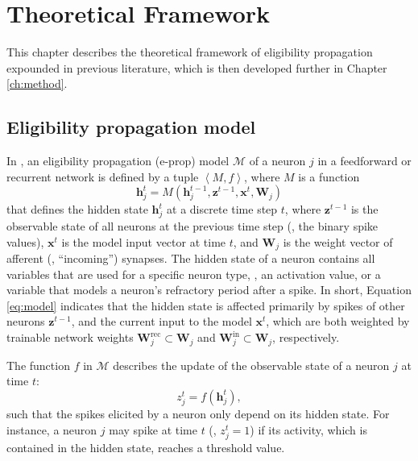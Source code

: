 \chapter{Theoretical Framework}\label{ch:relatedwork}

    This chapter describes the theoretical framework of eligibility propagation expounded in previous literature, which is then developed further in Chapter \ref{ch:method}.

    \section{Eligibility propagation model}
        In \citet{bellec2020solution}, an eligibility propagation (e-prop) model $\mathcal{M}$ of a neuron $j$ in a feedforward or recurrent network is defined by a tuple $\left<M, f\right>$,
        where $M$ is a function
        \begin{equation}\label{eq:model}
        \mathbf{h}^t_j = M\left(\mathbf{h}_j^{t-1}, \mathbf{z}^{t-1}, \mathbf{x}^t, \mathbf{W}_j\right)
        \end{equation}
        that defines the hidden state $\mathbf{h}_j^t$ at a discrete time step $t$, where $\mathbf{z}^{t-1}$ is the observable state of all neurons at the previous time step (\ie, the binary spike values), $\mathbf{x}^t$ is the model input vector at time $t$, and $\mathbf{W}_j$ is the weight vector of afferent (\ie, ``incoming'') synapses.
        The hidden state of a neuron contains all variables that are used for a specific neuron type, \eg, an activation value, or a variable that models a neuron's refractory period after a spike.
        In short, Equation \ref{eq:model} indicates that the hidden state is affected primarily by spikes of other neurons $\mathbf{z}^{t-1}$, and the current input to the model $\mathbf{x}^t$, which are both weighted by trainable network weights $\mathbf{W}^\text{rec}_j \subset \mathbf{W}_j$ and $\mathbf{W}^\text{in}_j \subset \mathbf{W}_j$, respectively.

        The function $f$ in $\mathcal{M}$ describes the update of the observable state of a neuron $j$ at time $t$:
        \begin{equation}\label{eq:observable}
        z^t_j = f\left(\mathbf{h}_j^t\right),
        \end{equation}
        such that the spikes elicited by a neuron only depend on its hidden state.
        For instance, a neuron $j$ may spike at time $t$ (\ie, $z^t_j = 1$) if its activity, which is contained in the hidden state, reaches a threshold value.

